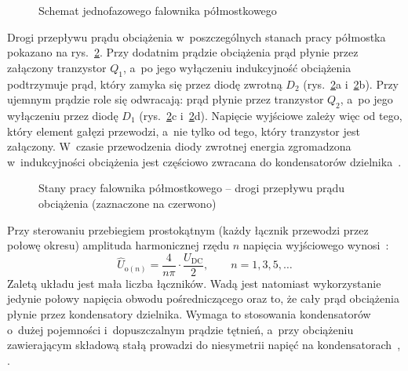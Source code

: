 \begin{figure}[htbp]
  \centering
  
  \caption{Schemat jednofazowego falownika półmostkowego}
  \label{fig:polmostek}
\end{figure}

Drogi przepływu prądu obciążenia w~poszczególnych stanach pracy półmostka
pokazano na rys.~\ref{fig:polmostek-stany}. Przy dodatnim prądzie
obciążenia prąd płynie przez załączony tranzystor $Q_1$, a~po jego
wyłączeniu indukcyjność obciążenia podtrzymuje prąd, który zamyka się przez
diodę zwrotną $D_2$ (rys.~\ref{fig:polmostek-stany}a
i~\ref{fig:polmostek-stany}b). Przy ujemnym prądzie role się odwracają:
prąd płynie przez tranzystor $Q_2$, a~po jego wyłączeniu przez diodę $D_1$
(rys.~\ref{fig:polmostek-stany}c i~\ref{fig:polmostek-stany}d). Napięcie
wyjściowe zależy więc od tego, który element gałęzi przewodzi, a~nie tylko
od tego, który tranzystor jest załączony. W~czasie przewodzenia diody
zwrotnej energia zgromadzona w~indukcyjności obciążenia jest częściowo
zwracana do kondensatorów dzielnika~\cite[s.~4]{instrukcja}.

\begin{figure}[htbp]
  \centering
  
  \caption{Stany pracy falownika półmostkowego -- drogi przepływu prądu
    obciążenia (zaznaczone na czerwono)}
  \label{fig:polmostek-stany}
\end{figure}

Przy sterowaniu przebiegiem prostokątnym (każdy łącznik przewodzi przez
połowę okresu) amplituda harmonicznej rzędu $n$ napięcia wyjściowego
wynosi~\cite[s.~6--7]{instrukcja}:
\begin{equation}
  \hat{U}_{\mathrm{o}(n)} = \frac{4}{n\pi} \cdot \frac{U_\mathrm{DC}}{2},
  \qquad n = 1, 3, 5, \ldots
  \label{eq:polmostek-harm}
\end{equation}
Zaletą układu jest mała liczba łączników. Wadą jest natomiast wykorzystanie
jedynie połowy napięcia obwodu pośredniczącego oraz to, że cały prąd
obciążenia płynie przez kondensatory dzielnika. Wymaga to stosowania
kondensatorów o~dużej pojemności i~dopuszczalnym prądzie tętnień, a~przy
obciążeniu zawierającym składową stałą prowadzi do niesymetrii napięć
na kondensatorach~\cite[s.~4, 15]{instrukcja}, \cite[podrozdz.~8-3-1]{mohan2003}.

